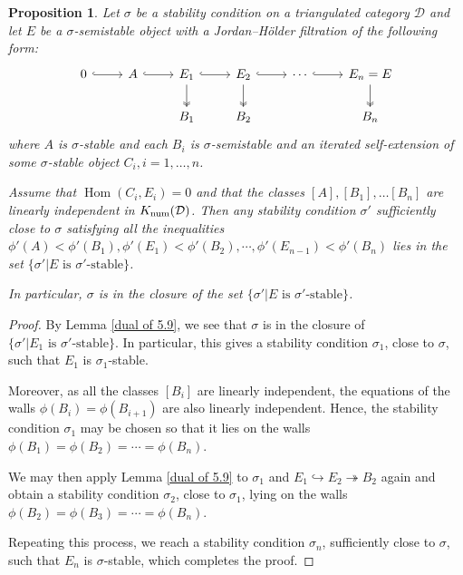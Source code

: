 \documentclass[12pt]{amsart}
\newtheorem{proposition}[theorem]{Proposition}
\theoremstyle{definition}
\DeclareMathOperator{\Hom}{Hom}
\DeclareMathOperator{\num}{num}
\begin{document}
\begin{proposition}\label{5.9iterative}
Let $\sigma$ be a stability condition on a triangulated category $\mathcal{D}$ 
and let $E$ be a $\sigma$-semistable object with a Jordan--Hölder filtration of the following form:
\[
\begin{tikzcd}
0 \arrow[r, hook] & A \arrow[r, hook] & E_1 \arrow[r, hook] \arrow[d, two heads] & E_2 \arrow[r, hook] \arrow[d, two heads] & \cdots \arrow[r, hook] & E_n=E \arrow[d, two heads] \\
&     & B_1          & B_2                       &     & B_n             
\end{tikzcd}
\]
where $A$ is $\sigma$-stable and each $B_i$ is $\sigma$-semistable and an iterated self-extension of some $\sigma$-stable object $C_i, i=1,\dots,n$.

Assume that $\Hom(C_i,E_i)=0$ and that the classes $[A],[B_1], \dots [B_n]$ are linearly independent in ${\rm K}_{\num}(\mathcal{D})$.
Then any stability condition $\sigma'$ sufficiently close to $\sigma$ satisfying all the inequalities $\phi'(A)<\phi'(B_1), \phi'(E_1)<\phi'(B_2),\cdots, \phi'(E_{n-1})<\phi'(B_n)$ lies in the set $\{\sigma'  |  E \text{ is } \sigma' \text{-stable} \}$.

In particular, $\sigma$ is in the closure of the set $\{\sigma'  |  E \text{ is } \sigma' \text{-stable} \}$. 
\end{proposition}
\begin{proof}
By Lemma \ref{dual of 5.9}, we see that $\sigma$ is in the closure of $\{\sigma'  |  E_1 \text{ is } \sigma' \text{-stable} \}$.
In particular, this gives a stability condition $\sigma_1$, close to $\sigma$, such that $E_1$ is $\sigma_1$-stable.

Moreover, as all the classes $[B_i]$ are linearly independent,
the equations of the walls $\phi(B_i)=\phi(B_{i+1})$ are also linearly independent.
Hence, the stability condition $\sigma_1$ may be chosen so that it lies on the walls $\phi(B_1)=\phi(B_2)= \cdots=\phi(B_n)$.

We may then apply Lemma \ref{dual of 5.9} to $\sigma_1$ and $E_1 \hookrightarrow E_2 \twoheadrightarrow B_2$ again and obtain a stability condition $\sigma_2$, close to $\sigma_1$, lying on the walls $\phi(B_2)=\phi(B_3)= \cdots=\phi(B_n)$.

Repeating this process, we reach a stability condition $\sigma_n$, sufficiently close to $\sigma$, such that $E_n$ is $\sigma$-stable,
which completes the proof.
\end{proof}
\end{document}
